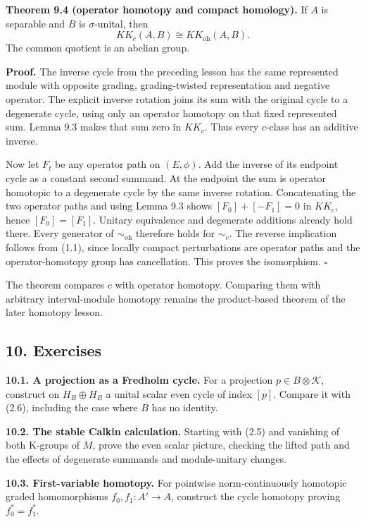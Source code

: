 \documentclass[
  11pt,
]{article}
\begin{document}
\textbf{Theorem 9.4 (operator homotopy and compact homology).} If \(A\)
is separable and \(B\) is \(\sigma\)-unital, then \[
KK_c(A,B)\cong KK_{\mathrm{oh}}(A,B).
\tag{9.7}
\] The common quotient is an abelian group.

\textbf{Proof.} The inverse cycle from the preceding lesson has the same
represented module with opposite grading, grading-twisted representation
and negative operator. The explicit inverse rotation joins its sum with
the original cycle to a degenerate cycle, using only an operator
homotopy on that fixed represented sum. Lemma 9.3 makes that sum zero in
\(KK_c\). Thus every \(c\)-class has an additive inverse.

Now let \(F_t\) be any operator path on \((E,\phi)\). Add the inverse of
its endpoint cycle as a constant second summand. At the endpoint the sum
is operator homotopic to a degenerate cycle by the same inverse
rotation. Concatenating the two operator paths and using Lemma 9.3 shows
\([F_0]+[-F_1]=0\) in \(KK_c\), hence \([F_0]=[F_1]\). Unitary
equivalence and degenerate additions already hold there. Every generator
of \(\sim_{\mathrm{oh}}\) therefore holds for \(\sim_c\). The reverse
implication follows from (1.1), since locally compact perturbations are
operator paths and the operator-homotopy group has cancellation. This
proves the isomorphism. \(\square\)

The theorem compares \(c\) with operator homotopy. Comparing them with
arbitrary interval-module homotopy remains the product-based theorem of
the later homotopy lesson.

\subsection{10. Exercises}\label{exercises}

\textbf{10.1. A projection as a Fredholm cycle.} For a projection
\(p\in B\otimes\mathcal K\), construct on \(H_B\oplus H_B\) a unital
scalar even cycle of index \([p]\). Compare it with (2.6), including the
case where \(B\) has no identity.

\textbf{10.2. The stable Calkin calculation.} Starting with (2.5) and
vanishing of both K-groups of \(M\), prove the even scalar picture,
checking the lifted path and the effects of degenerate summands and
module-unitary changes.

\textbf{10.3. First-variable homotopy.} For pointwise norm-continuously
homotopic graded homomorphisms \(f_0,f_1:A'\to A\), construct the cycle
homotopy proving \(f_0^*=f_1^*\).
\end{document}
